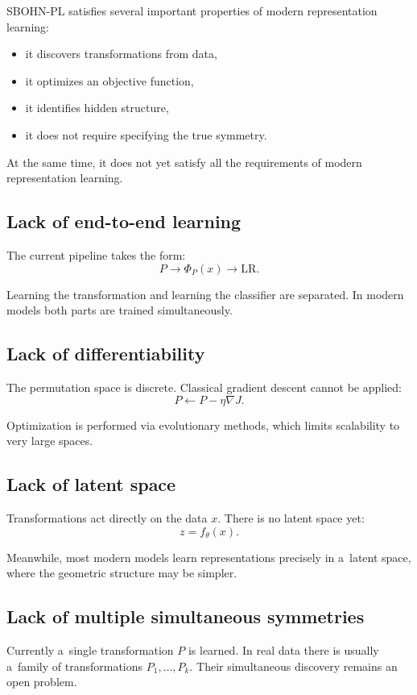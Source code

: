 \documentclass[11pt,a4paper]{report}
\begin{document}
SBOHN-PL satisfies several important properties of modern representation learning:
\begin{itemize}
\item it discovers transformations from data,
\item it optimizes an objective function,
\item it identifies hidden structure,
\item it does not require specifying the true symmetry.
\end{itemize}

At the same time, it does not yet satisfy all the requirements of modern representation learning.

\subsection{Lack of end-to-end learning}

The current pipeline takes the form:
\[
P
\longrightarrow
\Phi_P(x)
\longrightarrow
\text{LR}.
\]

Learning the transformation and learning the classifier are separated. In modern models both parts are trained simultaneously.

\subsection{Lack of differentiability}

The permutation space is discrete. Classical gradient descent cannot be applied:
\[
P\leftarrow P-\eta\nabla J.
\]

Optimization is performed via evolutionary methods, which limits scalability to very large spaces.

\subsection{Lack of latent space}

Transformations act directly on the data $x$. There is no latent space yet:
\[
z=f_\theta(x).
\]

Meanwhile, most modern models learn representations precisely in a~latent space, where the geometric structure may be simpler.

\subsection{Lack of multiple simultaneous symmetries}

Currently a~single transformation $P$ is learned. In real data there is usually a~family of transformations $P_1,\ldots,P_k$. Their simultaneous discovery remains an open problem.
\end{document}
